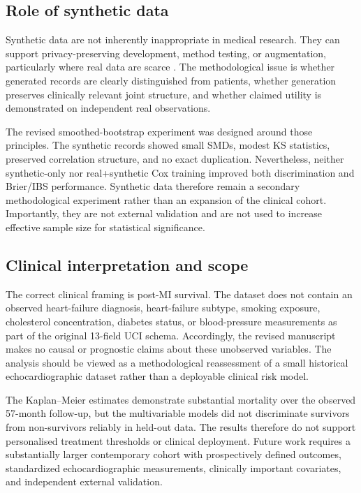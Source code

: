 \documentclass[a4paper,12pt]{article}
\begin{document}
\subsection{Role of synthetic data}
Synthetic data are not inherently inappropriate in medical research. They can support privacy-preserving development, method testing, or augmentation, particularly where real data are scarce \cite{ref40,ref41}. The methodological issue is whether generated records are clearly distinguished from patients, whether generation preserves clinically relevant joint structure, and whether claimed utility is demonstrated on independent real observations.

The revised smoothed-bootstrap experiment was designed around those principles. The synthetic records showed small SMDs, modest KS statistics, preserved correlation structure, and no exact duplication. Nevertheless, neither synthetic-only nor real+synthetic Cox training improved both discrimination and Brier/IBS performance. Synthetic data therefore remain a secondary methodological experiment rather than an expansion of the clinical cohort. Importantly, they are not external validation and are not used to increase effective sample size for statistical significance.

\subsection{Clinical interpretation and scope}
The correct clinical framing is post-MI survival. The dataset does not contain an observed heart-failure diagnosis, heart-failure subtype, smoking exposure, cholesterol concentration, diabetes status, or blood-pressure measurements as part of the original 13-field UCI schema. Accordingly, the revised manuscript makes no causal or prognostic claims about these unobserved variables. The analysis should be viewed as a methodological reassessment of a small historical echocardiographic dataset rather than a deployable clinical risk model.

The Kaplan--Meier estimates demonstrate substantial mortality over the observed 57-month follow-up, but the multivariable models did not discriminate survivors from non-survivors reliably in held-out data. The results therefore do not support personalised treatment thresholds or clinical deployment. Future work requires a substantially larger contemporary cohort with prospectively defined outcomes, standardized echocardiographic measurements, clinically important covariates, and independent external validation.
\end{document}
